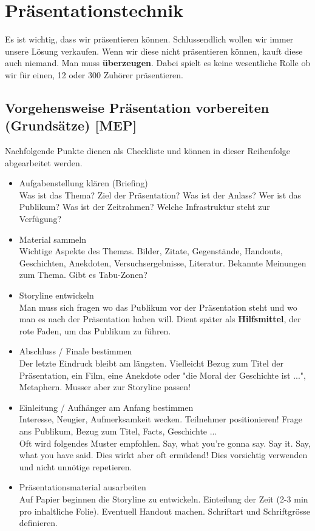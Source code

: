 \chapter{Präsentationstechnik}
Es ist wichtig, dass wir präsentieren können. Schlussendlich wollen wir immer unsere Lösung verkaufen. Wenn wir diese nicht präsentieren können, kauft diese auch niemand. Man muss \textbf{überzeugen}. Dabei spielt es keine wesentliche Rolle ob wir für einen, 12 oder 300 Zuhörer präsentieren.

\section{Vorgehensweise Präsentation vorbereiten (Grundsätze) [MEP]}
Nachfolgende Punkte dienen als Checkliste und können in dieser Reihenfolge abgearbeitet werden.

\begin{itemize}
	\item Aufgabenstellung klären (Briefing) \\
	Was ist das Thema? Ziel der Präsentation? Was ist der Anlass? Wer ist das Publikum? Was ist der Zeitrahmen? Welche Infrastruktur steht zur Verfügung?
	
	\item Material sammeln \\
	Wichtige Aspekte des Themas. Bilder, Zitate, Gegenstände, Handouts, Geschichten, Anekdoten, Versuchsergebnisse, Literatur. Bekannte Meinungen zum Thema. Gibt es Tabu-Zonen?
	
	\item Storyline entwickeln\\
	Man muss sich fragen wo das Publikum vor der Präsentation steht und wo man es nach der Präsentation haben will. Dient später als \textbf{Hilfsmittel}, der rote Faden, um das Publikum zu führen.
	
	\item Abschluss / Finale bestimmen\\
	Der letzte Eindruck bleibt am längsten. Vielleicht Bezug zum Titel der Präsentation, ein Film, eine Anekdote oder "die Moral der Geschichte ist ...", Metaphern. Musser aber zur Storyline passen!
	
	\item Einleitung / Aufhänger am Anfang bestimmen\\
	Interesse, Neugier, Aufmerksamkeit wecken. Teilnehmer positionieren! Frage ans Publikum, Bezug zum Titel, Facts, Geschichte ...\\
	Oft wird folgendes Muster empfohlen. Say, what you're gonna say. Say it. Say, what you have said. Dies wirkt aber oft ermüdend! Dies vorsichtig verwenden und nicht unnötige repetieren.
	
	\item Präsentationsmaterial ausarbeiten\\
	Auf Papier beginnen die Storyline zu entwickeln. Einteilung der Zeit (2-3 min pro inhaltliche Folie). Eventuell Handout machen. Schriftart und Schriftgrösse definieren.
	
\end{itemize}

